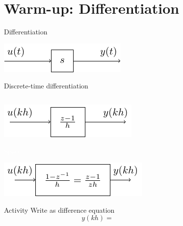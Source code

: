 \documentclass[presentation,aspectratio=1610]{beamer}
\begin{document}
\section{Warm-up: Differentiation}
\label{sec:org08f1454}

\begin{frame}[label={sec:orgc551c89}]{Differentiation}
\begin{center}
\includegraphics[width=0.5\linewidth]{../../figures/block-simple-derivative}
\end{center}
\end{frame}

\begin{frame}[label={sec:org24ceeec}]{Discrete-time differentiation}
\begin{columns}
\begin{column}{0.4\columnwidth}
\vspace*{5mm}

\includegraphics[width=\linewidth]{../../figures/block-simple-discrete-derivative-fwd-z}

\textcolor{white}{Space}

\begin{center}
\includegraphics[width=\linewidth]{../../figures/block-simple-discrete-derivative-z}
\end{center}

\alert{Activity} Write as difference equation \[ y(kh) = \] 
\end{column}
\begin{column}{0.6\columnwidth}
\end{column}
\end{columns}
\end{frame}
\end{document}
